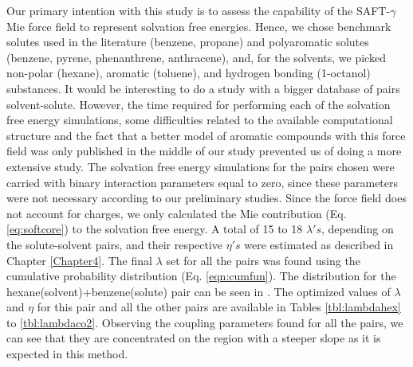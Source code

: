 Our primary intention with this study is to assess the capability of the SAFT-$\gamma$ Mie force field to represent solvation free energies. Hence, we chose benchmark solutes used in the literature (benzene, propane) and polyaromatic solutes (benzene, pyrene, phenanthrene, anthracene), and, for the solvents, we picked non-polar (hexane), aromatic (toluene), and hydrogen bonding (1-octanol) substances. It would be interesting to do a study with a bigger database of pairs solvent-solute. However, the time required for performing each of the solvation free energy simulations, some difficulties related to the available computational structure and the fact that a better model of aromatic compounds with this force field was only published in the middle of our study prevented us of doing a more extensive study. The solvation free energy simulations for the pairs chosen were carried with binary interaction parameters equal to zero, since these parameters were not necessary according to our preliminary studies. Since the force field does not account for charges, we only calculated the Mie contribution (Eq. \eqref{eq:softcore}) to the solvation free energy. A total of 15 to 18 $\lambda 's$, depending on the solute-solvent pairs, and their respective $\eta 's$ were estimated as described in Chapter \ref{Chapter4}. The final $\lambda$ set for all the pairs was found using the cumulative probability distribution (Eq. \eqref{eqn:cumfun}). The distribution for the hexane(solvent)+benzene(solute) pair can be seen in . The optimized values of $\lambda$ and $\eta$ for this pair and all the other pairs are available in Tables \ref{tbl:lambdahex} to \ref{tbl:lambdaco2}. Observing the coupling parameters found for all the pairs, we can see that they are concentrated on the region with a steeper slope as it is expected in this method.

